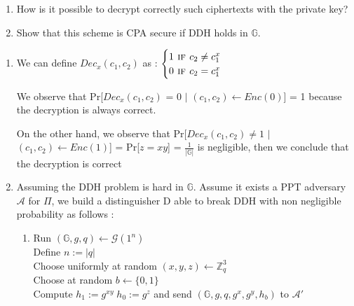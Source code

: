 \begin{enumerate}
	\item How is it possible to decrypt correctly such ciphertexts with the private key?
	\item Show that this scheme is CPA secure if DDH holds in $\mathbb{G}$. 
\end{enumerate}
\begin{solution}
\begin{enumerate}
    \item We can define $Dec_{x}(c_1, c_2)$ as : $\begin{cases}
    1 \textsc{ if } c_2 \neq c_1^x \\
    0 \textsc{ if } c_2 = c_1^x\\
\end{cases}$ 

    We observe that Pr[$Dec_{x}(c_1, c_2)$ = 0 $|$ $(c_1, c_2) \leftarrow Enc(0)$] = 1 because the decryption is always correct.
    
    On the other hand, we observe that Pr[$ Dec_{x}(c_1, c_2) \neq 1$ $|$ $(c_1, c_2) \leftarrow Enc(1)$] = Pr[$ z = xy $] = $\frac{1}{|\mathbb{G}|}$ is negligible, then we conclude that the decryption is correct
    
    \item Assuming the DDH problem is hard in $\mathbb{G}$. \newline
    Assume it exists a PPT adversary $\mathcal{A}$ for $\Pi$, we build a distinguisher D able to break DDH with non negligible probability as follows :
    \begin{enumerate}
        \item Run $(\mathbb{G},g,q) \leftarrow \mathcal{G}(1^n)$\\
        Define $n:=|q|$\\
        Choose uniformly at random $(x,y,z) \leftarrow \mathbb{Z}^3_q$\\
        Choose at random $b\leftarrow\{0,1\}$\\
        Compute $h_1:=g^{xy}\;h_0:=g^z$ and send $(\mathbb{G},g,q,g^x,g^y,h_b)$ to $\mathcal{A}'$
        

\end{enumerate}
\end{enumerate}
\end{solution}

